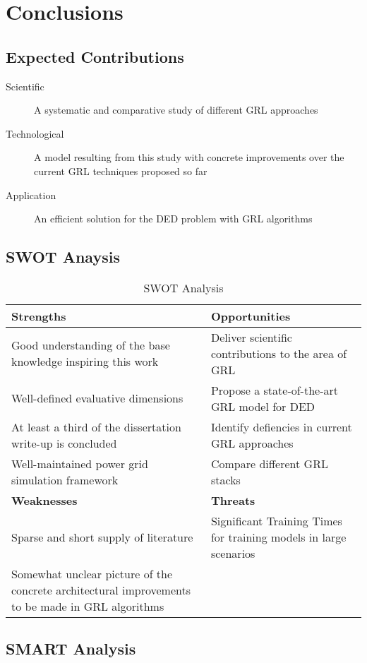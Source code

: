 \chapter{Conclusions} \label{chap:conclusions}

\section{Expected Contributions}

\begin{description}
	\item[Scientific] A systematic and comparative study of different GRL approaches
	\item[Technological] A model resulting from this study with concrete improvements over the current GRL techniques proposed so far
	\item[Application] An efficient solution for the DED problem with GRL algorithms
\end{description}

\section{SWOT Anaysis}

\begin{table}[h!]
	\centering
	\caption{SWOT Analysis}
	\begin{tabular}{|P{7cm}|P{7cm}|}
		\hline
		\textbf{Strengths} & \textbf{Opportunities} \\
		\hline
		Good understanding of the base knowledge inspiring this work & Deliver scientific contributions to the area of \ac{GRL} \\
		Well-defined evaluative dimensions & Propose a state-of-the-art \ac{GRL} model for \ac{DED} \\
		At least a third of the dissertation write-up is concluded & Identify defiencies in current \ac{GRL} approaches \\
		Well-maintained power grid simulation framework & Compare different \ac{GRL} stacks \\
		\hline
		\textbf{Weaknesses} & \textbf{Threats} \\
		\hline
		Sparse and short supply of literature & Significant Training Times for training models in large scenarios \\
		Somewhat unclear picture of the concrete architectural improvements to be made in \ac{GRL} algorithms  & \\
		\hline
	\end{tabular}
\end{table}

\section{SMART Analysis}

